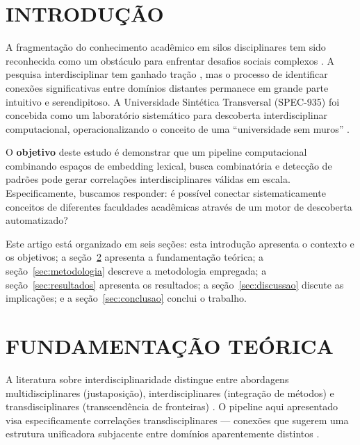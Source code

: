 \documentclass[a4paper,12pt]{article}
\begin{document}
\section{INTRODUÇÃO}

A fragmentação do conhecimento acadêmico em silos disciplinares tem sido reconhecida como 
um obstáculo para enfrentar desafios sociais complexos \cite{morin2000, nicolescu1996, nowotny2001}. 
A pesquisa interdisciplinar tem ganhado tração \cite{klein2010, frodeman2017, bammer2013}, mas 
o processo de identificar conexões significativas entre domínios distantes permanece em grande 
parte intuitivo e serendipitoso. A Universidade Sintética Transversal (SPEC-935) foi concebida 
como um laboratório sistemático para descoberta interdisciplinar computacional, operacionalizando 
o conceito de uma ``universidade sem muros'' \cite{barnett2011}.

O \textbf{objetivo} deste estudo é demonstrar que um pipeline computacional combinando espaços de 
embedding lexical, busca combinatória e detecção de padrões pode gerar correlações 
interdisciplinares válidas em escala. Especificamente, buscamos responder: é possível conectar 
sistematicamente conceitos de diferentes faculdades acadêmicas através de um motor de descoberta 
automatizado?

Este artigo está organizado em seis seções: esta introdução apresenta o contexto e os objetivos; 
a seção~\ref{sec:fundamentacao} apresenta a fundamentação teórica; a seção~\ref{sec:metodologia} 
descreve a metodologia empregada; a seção~\ref{sec:resultados} apresenta os resultados; a 
seção~\ref{sec:discussao} discute as implicações; e a seção~\ref{sec:conclusao} conclui o trabalho.

\section{FUNDAMENTAÇÃO TEÓRICA}\label{sec:fundamentacao}

A literatura sobre interdisciplinaridade distingue entre abordagens multidisciplinares 
(justaposição), interdisciplinares (integração de métodos) e transdisciplinares (transcendência 
de fronteiras) \cite{klein1990, nicolescu1996, bernstein2015}. O pipeline aqui apresentado 
visa especificamente correlações transdisciplinares --- conexões que sugerem uma estrutura 
unificadora subjacente entre domínios aparentemente distintos \cite{morin2000, piaget1972}.
\end{document}
